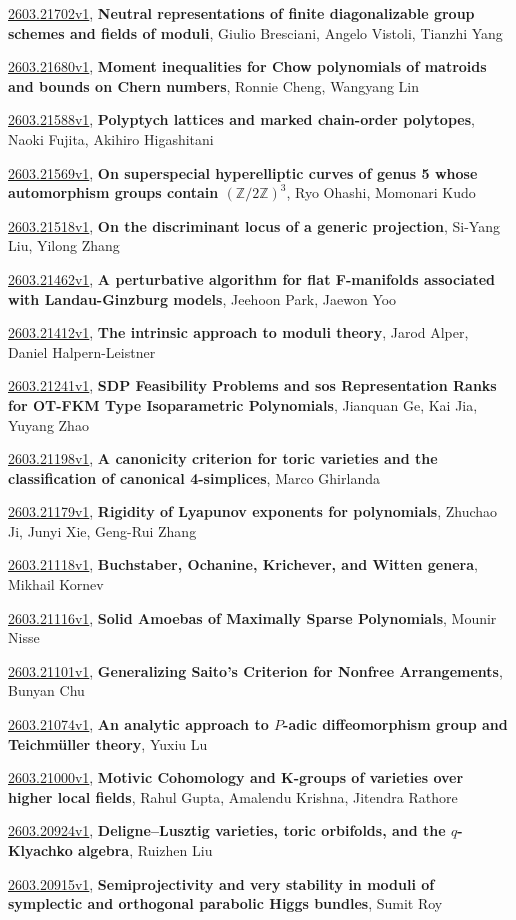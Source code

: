 \documentclass[9pt, a4paper]{article}
\theoremstyle{plain}
\theoremstyle{definition}
\theoremstyle{remark}
\newcommand{\arxiv}[3]{\href{https://arxiv.org/abs/#1}{#1}, \textbf{\textcolor{arxivblue}{#2}}, #3}
\begin{document}
\arxiv{2603.21702v1}{Neutral representations of finite diagonalizable group schemes and fields of moduli}{Giulio Bresciani, Angelo Vistoli, Tianzhi Yang}

\arxiv{2603.21680v1}{Moment inequalities for Chow polynomials of matroids and bounds on Chern numbers}{Ronnie Cheng, Wangyang Lin}

\arxiv{2603.21588v1}{Polyptych lattices and marked chain-order polytopes}{Naoki Fujita, Akihiro Higashitani}

\arxiv{2603.21569v1}{On superspecial hyperelliptic curves of genus 5 whose automorphism groups contain $(\mathbb{Z}/2\mathbb{Z})^3$}{Ryo Ohashi, Momonari Kudo}

\arxiv{2603.21518v1}{On the discriminant locus of a generic projection}{Si-Yang Liu, Yilong Zhang}

\arxiv{2603.21462v1}{A perturbative algorithm for flat F-manifolds associated with Landau-Ginzburg models}{Jeehoon Park, Jaewon Yoo}

\arxiv{2603.21412v1}{The intrinsic approach to moduli theory}{Jarod Alper, Daniel Halpern-Leistner}

\arxiv{2603.21241v1}{SDP Feasibility Problems and sos Representation Ranks for OT-FKM Type Isoparametric Polynomials}{Jianquan Ge, Kai Jia, Yuyang Zhao}

\arxiv{2603.21198v1}{A canonicity criterion for toric varieties and the classification of canonical 4-simplices}{Marco Ghirlanda}

\arxiv{2603.21179v1}{Rigidity of Lyapunov exponents for polynomials}{Zhuchao Ji, Junyi Xie, Geng-Rui Zhang}

\arxiv{2603.21118v1}{Buchstaber, Ochanine, Krichever, and Witten genera}{Mikhail Kornev}

\arxiv{2603.21116v1}{Solid Amoebas of Maximally Sparse Polynomials}{Mounir Nisse}

\arxiv{2603.21101v1}{Generalizing Saito's Criterion for Nonfree Arrangements}{Bunyan Chu}

\arxiv{2603.21074v1}{An analytic approach to $P$-adic diffeomorphism group and Teichmüller theory}{Yuxiu Lu}

\arxiv{2603.21000v1}{Motivic Cohomology and K-groups of varieties over higher local fields}{Rahul Gupta, Amalendu Krishna, Jitendra Rathore}

\arxiv{2603.20924v1}{Deligne--Lusztig varieties, toric orbifolds, and the $q$-Klyachko algebra}{Ruizhen Liu}

\arxiv{2603.20915v1}{Semiprojectivity and very stability in moduli of symplectic and orthogonal parabolic Higgs bundles}{Sumit Roy}
\end{document}
